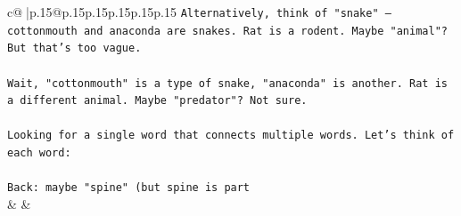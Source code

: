 \documentclass{article}
\begin{document}
{\begin{supertabular}{c@{$\;$}|p{.15\linewidth}@{}p{.15\linewidth}p{.15\linewidth}p{.15\linewidth}p{.15\linewidth}p{.15\linewidth}}
{{{\texttt{Alternatively, think of "snake" – cottonmouth and anaconda are snakes. Rat is a rodent. Maybe "animal"? But that's too vague. } \\
\\ 
\texttt{Wait, "cottonmouth" is a type of snake, "anaconda" is another. Rat is a different animal. Maybe "predator"? Not sure. } \\
\\ 
\texttt{Looking for a single word that connects multiple words. Let's think of each word:} \\
\\ 
\texttt{Back: maybe "spine" (but spine is part} \\
            }
        }
    }
    & & \\ \\


\end{supertabular}}
\end{document}
